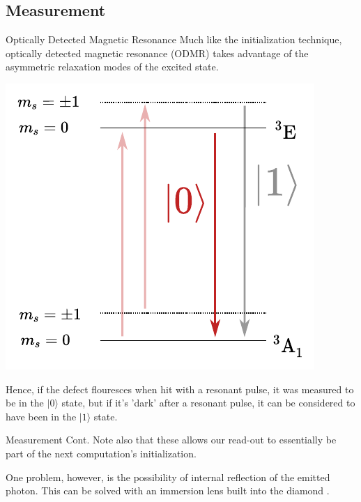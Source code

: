 \documentclass[11pt]{beamer}
\begin{document}
\subsection{Measurement}
\begin{frame}{Optically Detected Magnetic Resonance}\small
Much like the initialization technique, optically detected magnetic resonance (ODMR) takes advantage of the asymmetric relaxation modes of the excited state.

\begin{center}
\includegraphics[scale=0.6]{energy_measure.pdf}
\end{center}

Hence, if the defect flouresces when hit with a resonant pulse, it was measured to be in the $\vert 0 \rangle$ state, but if it's 'dark' after a resonant pulse, it can be considered to have been in the $\vert 1 \rangle$ state.

\medskip


\end{frame}

\begin{frame}{Measurement Cont.}
Note also that these allows our read-out to essentially be part of the next computation's initialization.

\vspace{.5cm}\pause

One problem, however, is the possibility of internal reflection of the emitted photon. \pause This can be solved with an immersion lens built into the diamond \cite{hadden2010strongly}.
\end{frame}
\end{document}
